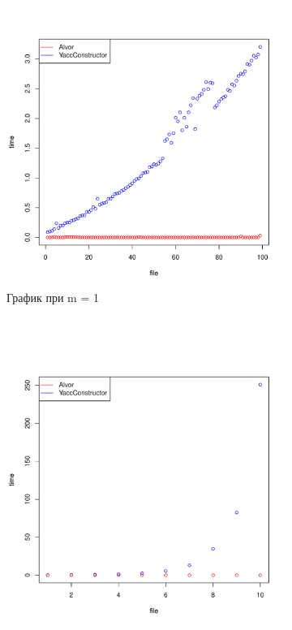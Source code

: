 \documentclass{matmex-diploma}
\begin{document}
\begin{figure}
        \centering
        \begin{subfigure}[b]{0.3\textwidth}
                \includegraphics[width=\textwidth]{m=1_breakYC_Alvor.pdf}
                \caption{График при m = 1}
                \label{fig:m=1_YC_Alvor}
        \end{subfigure}%
        ~ %
        \begin{subfigure}[b]{0.3\textwidth}
                \includegraphics[width=\textwidth]{m=2_breakYC_Alvor}

\end{subfigure}
\end{figure}
\end{document}
